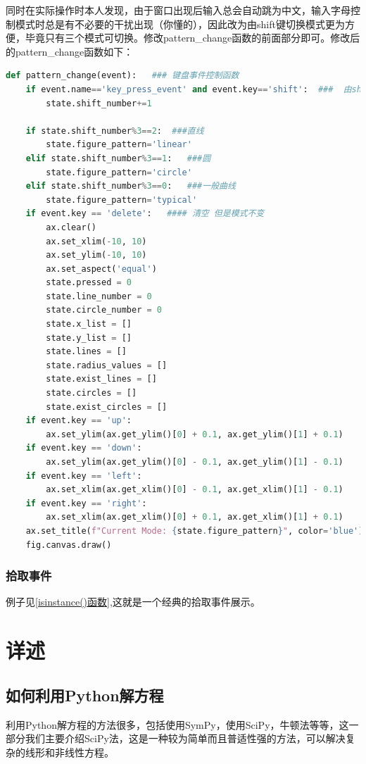 \documentclass[12pt]{article}
\begin{document}
同时在实际操作时本人发现，由于窗口出现后输入总会自动跳为中文，输入字母控制模式时总是有不必要的干扰出现（你懂的），因此改为由shift键切换模式更为方便，毕竟只有三个模式可切换。修改pattern\_change函数的前面部分即可。修改后的pattern\_change函数如下：
\begin{lstlisting}[language=Python]
def pattern_change(event):   ### 键盘事件控制函数
    if event.name=='key_press_event' and event.key=='shift':  ###  由shift键操控
        state.shift_number+=1

    if state.shift_number%3==2:  ###直线
        state.figure_pattern='linear'
    elif state.shift_number%3==1:   ###圆
        state.figure_pattern='circle'
    elif state.shift_number%3==0:   ###一般曲线
        state.figure_pattern='typical'
    if event.key == 'delete':   #### 清空 但是模式不变
        ax.clear()
        ax.set_xlim(-10, 10)
        ax.set_ylim(-10, 10)
        ax.set_aspect('equal')
        state.pressed = 0
        state.line_number = 0
        state.circle_number = 0
        state.x_list = []
        state.y_list = []
        state.lines = []
        state.radius_values = []
        state.exist_lines = []
        state.circles = []
        state.exist_circles = []
    if event.key == 'up':
        ax.set_ylim(ax.get_ylim()[0] + 0.1, ax.get_ylim()[1] + 0.1)
    if event.key == 'down':
        ax.set_ylim(ax.get_ylim()[0] - 0.1, ax.get_ylim()[1] - 0.1)
    if event.key == 'left':
        ax.set_xlim(ax.get_xlim()[0] - 0.1, ax.get_xlim()[1] - 0.1)
    if event.key == 'right':
        ax.set_xlim(ax.get_xlim()[0] + 0.1, ax.get_xlim()[1] + 0.1)
    ax.set_title(f"Current Mode: {state.figure_pattern}", color='blue')
    fig.canvas.draw()
\end{lstlisting}
\subsubsection{拾取事件}
例子见\ref{isinstance()函数},这就是一个经典的拾取事件展示。

\newpage

\section{详述}\label{详述}
\subsection{如何利用Python解方程}\label{如何利用Python解方程}
利用Python解方程的方法很多，包括使用SymPy，使用SciPy，牛顿法等等，这一部分我们主要介绍SciPy法，这是一种较为简单而且普适性强的方法，可以解决复杂的线形和非线性方程。
\end{document}
